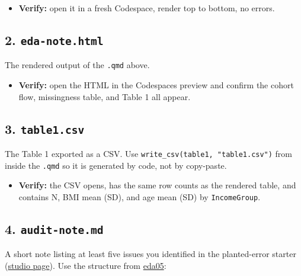 \documentclass[
  letterpaper,
  DIV=11,
  numbers=noendperiod,
  oneside]{scrreprt}
\providecommand{\tightlist}{%
  \setlength{\itemsep}{0pt}\setlength{\parskip}{0pt}}
\begin{document}
\begin{itemize}
\tightlist
\item
  \textbf{Verify:} open it in a fresh Codespace, render top to bottom,
  no errors.
\end{itemize}

\subsection*{\texorpdfstring{2.
\texttt{eda-note.html}}{2. eda-note.html}}\label{eda-note.html}

The rendered output of the \texttt{.qmd} above.

\begin{itemize}
\tightlist
\item
  \textbf{Verify:} open the HTML in the Codespaces preview and confirm
  the cohort flow, missingness table, and Table 1 all appear.
\end{itemize}

\subsection*{\texorpdfstring{3.
\texttt{table1.csv}}{3. table1.csv}}\label{table1.csv}

The Table 1 exported as a CSV. Use
\texttt{write\_csv(table1,\ "table1.csv")} from inside the \texttt{.qmd}
so it is generated by code, not by copy-paste.

\begin{itemize}
\tightlist
\item
  \textbf{Verify:} the CSV opens, has the same row counts as the
  rendered table, and contains N, BMI mean (SD), and age mean (SD) by
  \texttt{IncomeGroup}.
\end{itemize}

\subsection*{\texorpdfstring{4.
\texttt{audit-note.md}}{4. audit-note.md}}\label{audit-note.md}

A short note listing at least five issues you identified in the
planted-error starter
(\hyperref[in-class-studio-planted-error-audit]{studio page}). Use the
structure from
\hyperref[four-audit-categories-for-ai-drafted-eda]{eda05}:
\end{document}
